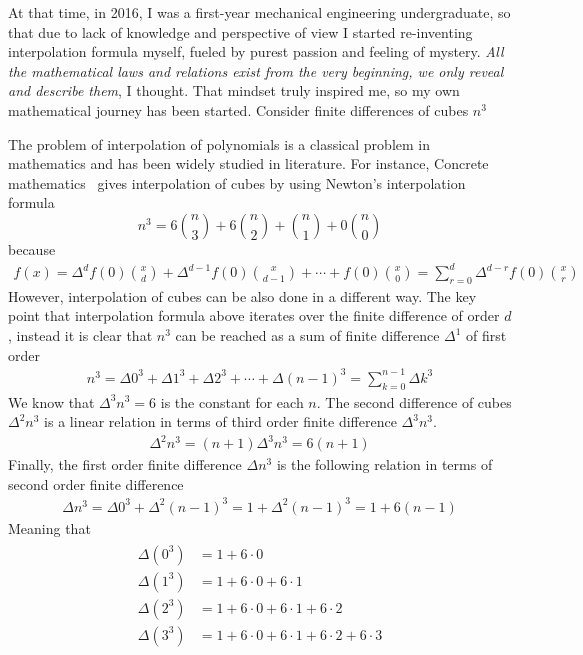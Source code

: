 At that time, in 2016, I was a first-year mechanical engineering undergraduate,
so that due to lack of knowledge and perspective of view I started re-inventing interpolation
formula myself, fueled by purest passion and feeling of mystery.
\textit{All the mathematical laws and relations exist from the very beginning, we only reveal and describe them},
I thought.
That mindset truly inspired me, so my own mathematical journey has been started.
Consider finite differences of cubes $n^3$

The problem of interpolation of polynomials is a classical problem in mathematics and has been widely studied in literature.
For instance, Concrete mathematics~\cite{graham1989concrete} gives interpolation of cubes by using
Newton's interpolation formula
\[
    n^3 = 6 \binom{n}{3} + 6 \binom{n}{2} + \binom{n}{1} + 0 \binom{n}{0}
\]
because
\begin{align*}
    f(x) = \Delta^{d} f(0) \binom{x}{d} +  \Delta^{d-1} f(0) \binom{x}{d-1} + \cdots + f(0) \binom{x}{0}
    = \sum_{r=0}^{d} \Delta^{d-r} f(0) \binom{x}{r}
\end{align*}
However, interpolation of cubes can be also done in a different way.
The key point that interpolation formula above iterates over the finite difference of order $d$,
instead it is clear that $n^3$ can be reached as a sum of finite difference $\Delta^1$ of first order
\begin{align*}
    n^3 = \Delta 0^3 + \Delta 1^3 + \Delta 2^3 + \cdots + \Delta (n-1)^3 = \sum_{k=0}^{n-1} \Delta k^3
\end{align*}
We know that $\Delta^3 n^3 = 6$ is the constant for each $n$.
The second difference of cubes $\Delta^2 n^3$ is a linear relation in terms of third order finite difference
$\Delta^3 n^3$.
\begin{align*}
    \Delta^2 n^3 = (n+1) \Delta^3 n^3 = 6(n+1)
\end{align*}
Finally, the first order finite difference $\Delta n^3$ is the following relation in terms of second
order finite difference
\begin{align*}
    \Delta n^3 = \Delta 0^3 + \Delta^2 (n-1)^3 = 1 + \Delta^2 (n-1)^3 = 1 + 6(n-1)
\end{align*}
Meaning that
\begin{align*}
    \begin{split}
        \Delta(0^3) &= 1+6 \cdot 0 \\
        \Delta(1^3) &= 1+6\cdot0+6\cdot1 \\
        \Delta(2^3) &= 1+6\cdot0+6\cdot1+6\cdot2 \\
        \Delta(3^3) &= 1+6\cdot0+6\cdot1+6\cdot2+6\cdot3
    \end{split}
\end{align*}
